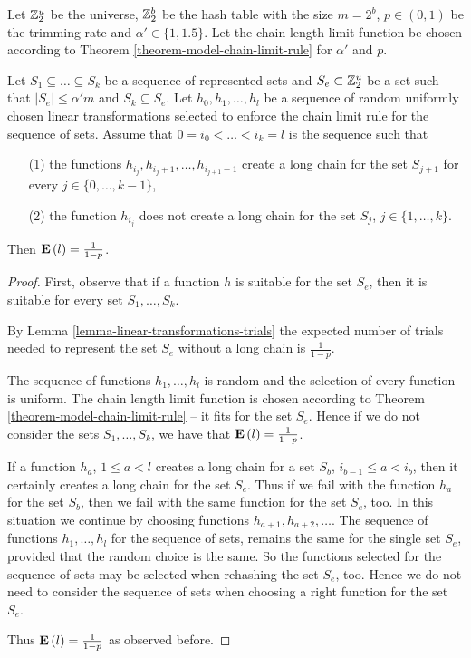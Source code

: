 \begin{lemma}
\label{lemma-sets}
Let $\mathbb{Z}_{2}^{u}$ be the universe, $\mathbb{Z}_{2}^{b}$ be the hash table with the size $m = 2 ^ b$, $p \in (0, 1)$ be the trimming rate and $\alpha' \in \{1, 1.5\}$. Let the chain length limit function be chosen according to Theorem \ref{theorem-model-chain-limit-rule} for $\alpha'$ and $p$. 

Let $S_1 \subseteq \dots \subseteq S_k$ be a sequence of represented sets and $S_e \subset \mathbb{Z}_{2}^{u}$ be a set such that $|S_e| \leq \alpha'm$ and $S_k \subseteq S_e$. Let $h_0, h_1, \dots, h_l$ be a sequence of random uniformly chosen linear transformations selected to enforce the chain limit rule for the sequence of sets. Assume that $0 = i_0 < \dots < i_k = l$ is the sequence such that 
\begin{enumerate}
\item[(1)] the functions $h_{i_{j}}, h_{i_{j} + 1}, \dots, h_{i_{j + 1} - 1}$ create a long chain for the set $S_{j + 1}$ for every $j \in \{0, \dots, k - 1 \}$,
\item[(2)] the function $h_{i_{j}}$ does not create a long chain for the set $S_j$, $j \in \{1, \dots, k\}$.
\end{enumerate}
Then $\mathbf{E}\left(l\right) = \frac{1}{1 - p}$.
\end{lemma}
\begin{proof}
First, observe that if a function $h$ is suitable for the set $S_e$, then it is suitable for every set $S_1, \dots, S_k$.

By Lemma \ref{lemma-linear-transformations-trials} the expected number of trials needed to represent the set $S_e$ without a long chain is $\frac{1}{1 - p}$.

The sequence of functions $h_1, \dots, h_l$ is random and the selection of every function is uniform. The chain length limit function is chosen according to Theorem \ref{theorem-model-chain-limit-rule} -- it fits for the set $S_e$. Hence if we do not consider the sets $S_1, \dots, S_k$, we have that $\mathbf{E}\left(l\right) = \frac{1}{1 - p}$.

If a function $h_a$, $1 \leq a < l$ creates a long chain for a set $S_b$, $i_{b - 1} \leq a < i_b$, then it certainly creates a long chain for the set $S_e$. Thus if we fail with the function $h_a$ for the set $S_b$, then we fail with the same function for the set $S_e$, too. In this situation we continue by choosing functions $h_{a + 1}, h_{a + 2}, \dots$. The sequence of functions $h_1, \dots, h_l$ for the sequence of sets, remains the same for the single set $S_e$, provided that the random choice is the same. So the functions selected for the sequence of sets may be selected when rehashing the set $S_e$, too. Hence we do not need to consider the sequence of sets when choosing a right function for the set $S_e$. 

Thus $\mathbf{E}\left(l\right) = \frac{1}{1 - p}$ as observed before.
\end{proof}


